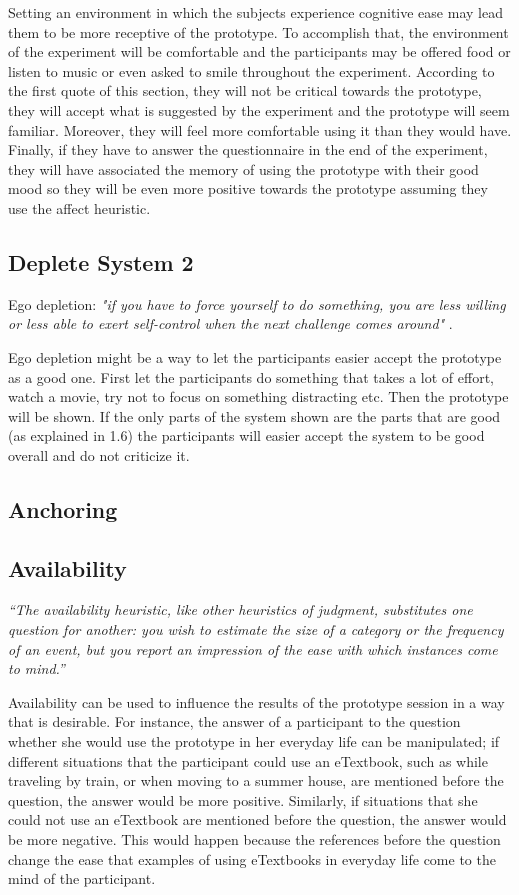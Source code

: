 \documentclass{article}
\begin{document}
Setting an environment in which the subjects experience cognitive ease may lead them to be more receptive of the prototype. To accomplish that, the environment of the experiment will be comfortable and the participants may be offered food or listen to music or even asked to smile throughout the experiment. According to the first quote of this section, they will not be critical towards the prototype, they will accept what is suggested by the experiment and the prototype will seem familiar. Moreover, they will feel more comfortable using it than they would have. Finally, if they have to answer the questionnaire in the end of the experiment, they will have associated the memory of using the prototype with their good mood so they will be even more positive towards the prototype assuming they use the affect heuristic.

\subsection{Deplete System 2}
Ego depletion:\emph{ "if you have to force yourself to do something, you are less willing
or less able to exert self-control when the next challenge comes around" }.

Ego depletion might be a way to let the participants easier accept the prototype
as a good one. First let the participants do something that takes a lot of effort, watch
a movie, try not to focus on something distracting etc. Then the prototype will
be shown. If the only parts of the system shown are the parts that are good
(as explained in 1.6) the participants will easier  accept the system to be good overall
 and do not criticize it.

\subsection{Anchoring}

\subsection{Availability}
\emph{``The availability heuristic, like other heuristics of judgment, substitutes one question for another: you wish to estimate the size of a category or the frequency of an event, but you report an impression of the ease with which instances come to mind.''}

Availability can be used to influence the results of the prototype session in a way that is desirable. For instance, the answer of a participant to the question whether she would use the prototype in her everyday life can be manipulated; if different situations that the participant could use an eTextbook, such as while traveling by train, or when moving to a summer house, are mentioned before the question, the answer would be more positive. Similarly,  if situations that she could not use an eTextbook are mentioned before the question, the answer would be more negative. This would happen because the references before the question change the ease that examples of using eTextbooks in everyday life come to the mind of the participant.
\end{document}
